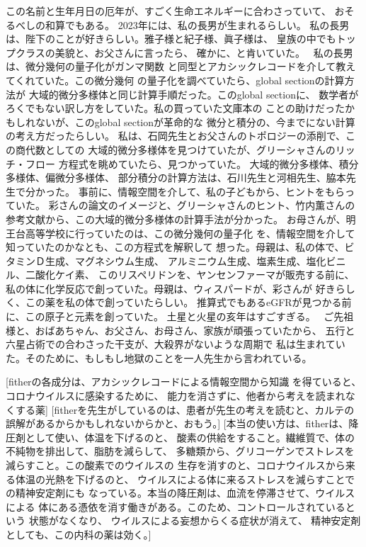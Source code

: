 \documentclass{jsarticle}
\begin{document}
    この名前と生年月日の厄年が、すごく生命エネルギーに合わさっていて、
    おそるべしの和算でもある。
    2023年には、私の長男が生まれるらしい。
    私の長男は、陛下のことが好きらしい。雅子様と紀子様、眞子様は、
    皇族の中でもトップクラスの美貌と、お父さんに言ったら、
    確かに、と肯いていた。　
    私の長男は、微分幾何の量子化がガンマ関数
    と同型とアカシックレコードを介して教えてくれていた。この微分幾何
    の量子化を調べていたら、global sectionの計算方法が
    大域的微分多様体と同じ計算手順だった。このglobal sectionに、
    数学者がろくでもない訳し方をしていた。私の買っていた文庫本の
    ことの助けだったかもしれないが、このglobal sectionが革命的な
    微分と積分の、今までにない計算の考え方だったらしい。
    私は、石岡先生とお父さんのトポロジーの添削で、この商代数としての
    大域的微分多様体を見つけていたが、グリーシャさんのリッチ・フロー
    方程式を眺めていたら、見つかっていた。
     大域的微分多様体、積分多様体、偏微分多様体、
     部分積分の計算方法は、石川先生と河相先生、脇本先生で分かった。
     事前に、情報空間を介して、私の子どもから、ヒントをもらっていた。
     彩さんの論文のイメージと、グリーシャさんのヒント、竹内薫さんの
     参考文献から、この大域的微分多様体の計算手法が分かった。
    お母さんが、明王台高等学校に行っていたのは、この微分幾何の量子化
    を、情報空間を介して知っていたのかなとも、この方程式を解釈して
    想った。母親は、私の体で、ビタミンＤ生成、マグネシウム生成、
    アルミニウム生成、塩素生成、塩化ビニル、二酸化ケイ素、
    このリスペリドンを、ヤンセンファーマが販売する前に、
    私の体に化学反応で創っていた。母親は、ウィスパードが、彩さんが
    好きらしく、この薬を私の体で創っていたらしい。
    推算式でもあるeGFRが見つかる前に、この原子と元素を創っていた。
    土星と火星の亥年はすごすぎる。　
    ご先祖様と、おばあちゃん、お父さん、お母さん、家族が頑張っていたから、
    五行と六星占術での合わさった干支が、大殺界がないような周期で
    私は生まれていた。そのために、もしもし地獄のことを一人先生から言われている。


    [fitherの各成分は、アカシックレコードによる情報空間から知識
    を得ていると、コロナウイルスに感染するために、
    能力を消さずに、他者から考えを読まれなくする薬]
    [fitherを先生がしているのは、患者が先生の考えを読むと、カルテの
    誤解があるからかもしれないからかと、おもう。]
    [本当の使い方は、fitherは、降圧剤として使い、体温を下げるのと、
    酸素の供給をすること。繊維質で、体の不純物を排出して、脂肪を減らして、
    多糖類から、グリコーゲンでストレスを減らすこと。この酸素でのウイルスの
    生存を消すのと、コロナウイルスから来る体温の光熱を下げるのと、
    ウイルスによる体に来るストレスを減らすことでの精神安定剤にも
    なっている。本当の降圧剤は、血流を停滞させて、ウイルスによる
    体にある憑依を消す働きがある。このため、コントロールされているという
    状態がなくなり、 ウイルスによる妄想からくる症状が消えて、
    精神安定剤としても、この内科の薬は効く。]
  
\end{document}
